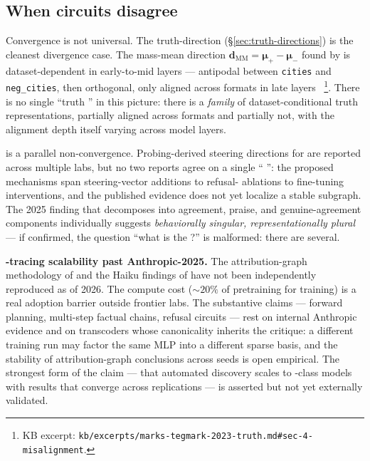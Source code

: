 \subsection{When circuits disagree}
\label{sec:circuit-disagreement}

Convergence is not universal. The truth-direction 
(\S\ref{sec:truth-directions}) is the cleanest divergence case. The
mass-mean direction $\mathbf{d}_{\mathrm{MM}} = \boldsymbol{\mu}_+ -
\boldsymbol{\mu}_-$ found by \citet{marks-tegmark-2023-truth} is
dataset-dependent in early-to-mid layers --- antipodal between
\texttt{cities} and \texttt{neg\_cities}, then orthogonal, only aligned
across formats in late layers~\citep[\S 4]{marks-tegmark-2023-truth}%
\footnote{KB excerpt:
\texttt{kb/excerpts/marks-tegmark-2023-truth.md\#sec-4-misalignment}.}.
There is no single ``truth '' in this picture: there is a
\emph{family} of dataset-conditional truth representations, partially
aligned across formats and partially not, with the alignment depth
itself varying across model layers.

 is a parallel non-convergence. Probing-derived steering
directions for  are reported across multiple labs, but no
two reports agree on a single `` '': the proposed
mechanisms span steering-vector additions to refusal-
ablations to fine-tuning interventions, and the published evidence
does not yet localize a stable subgraph. The 2025 finding that
 decomposes into agreement, praise, and genuine-agreement
components individually suggests \emph{behaviorally singular,
representationally plural} --- if confirmed, the question ``what is
the  ?'' is malformed: there are several.

\begin{contradiction}
\textbf{-tracing scalability past Anthropic-2025.} The
attribution-graph methodology of \citet{lindsey2025-circuit-tracing}
and the Haiku findings of \citet{lindsey2025-biology} have not been
independently reproduced as of 2026. The compute cost
($\sim\!20\%$ of pretraining for  training) is a real
adoption barrier outside frontier labs. The substantive claims
--- forward planning, multi-step factual chains, refusal circuits ---
rest on internal Anthropic evidence and on transcoders whose
canonicality inherits the \citet{leask2025-sae-not-canonical}
critique: a different  training run may factor the same MLP
into a different sparse basis, and the stability of attribution-graph
conclusions across  seeds is open empirical. The strongest
form of the claim --- that automated  discovery scales to
-class models with results that converge across replications
--- is asserted but not yet externally validated.
\end{contradiction}

